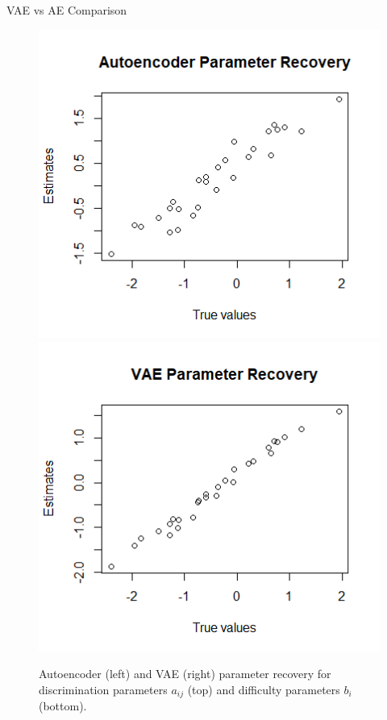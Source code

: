 \documentclass{beamer}
\theoremstyle{definition}
\begin{document}
\begin{frame}{VAE vs AE Comparison}
\begin{figure}[h!]
    \includegraphics[width=\textwidth]{img/aied_results/ae_b_corr.png}
\endminipage\hfill
{}
    \includegraphics[width=\textwidth]{img/aied_results/vae_b_corr.png}
\endminipage\hfill
\caption{Autoencoder (left) and VAE (right) parameter recovery for discrimination parameters $a_{ij}$ (top) and difficulty parameters $b_i$ (bottom).}
\label{fig:b_corr}
\end{figure}
\end{frame}
\end{document}

